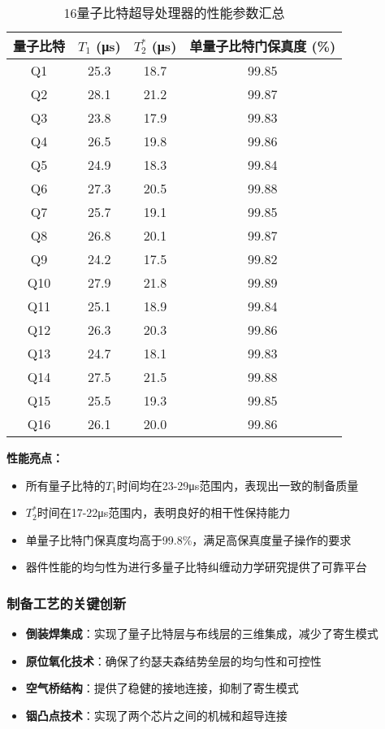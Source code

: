 \documentclass[11pt,a4paper]{article}
\begin{document}
\begin{table}[H]
\centering
\caption{16量子比特超导处理器的性能参数汇总}
\begin{tabular}{cccc}
\toprule
\textbf{量子比特} & \textbf{$T_1$ (μs)} & \textbf{$T_2^*$ (μs)} & \textbf{单量子比特门保真度 (\%)} \\
\midrule
Q1 & 25.3 & 18.7 & 99.85 \\
Q2 & 28.1 & 21.2 & 99.87 \\
Q3 & 23.8 & 17.9 & 99.83 \\
Q4 & 26.5 & 19.8 & 99.86 \\
Q5 & 24.9 & 18.3 & 99.84 \\
Q6 & 27.3 & 20.5 & 99.88 \\
Q7 & 25.7 & 19.1 & 99.85 \\
Q8 & 26.8 & 20.1 & 99.87 \\
Q9 & 24.2 & 17.5 & 99.82 \\
Q10 & 27.9 & 21.8 & 99.89 \\
Q11 & 25.1 & 18.9 & 99.84 \\
Q12 & 26.3 & 20.3 & 99.86 \\
Q13 & 24.7 & 18.1 & 99.83 \\
Q14 & 27.5 & 21.5 & 99.88 \\
Q15 & 25.5 & 19.3 & 99.85 \\
Q16 & 26.1 & 20.0 & 99.86 \\
\bottomrule
\end{tabular}
\label{tab:device_performance}
\end{table}

\textbf{性能亮点：}
\begin{itemize}
    \item 所有量子比特的$T_1$时间均在23-29μs范围内，表现出一致的制备质量
    \item $T_2^*$时间在17-22μs范围内，表明良好的相干性保持能力
    \item 单量子比特门保真度均高于99.8\%，满足高保真度量子操作的要求
    \item 器件性能的均匀性为进行多量子比特纠缠动力学研究提供了可靠平台
\end{itemize}

\subsubsection{制备工艺的关键创新}

\begin{itemize}
    \item \textbf{倒装焊集成}：实现了量子比特层与布线层的三维集成，减少了寄生模式
    \item \textbf{原位氧化技术}：确保了约瑟夫森结势垒层的均匀性和可控性
    \item \textbf{空气桥结构}：提供了稳健的接地连接，抑制了寄生模式
    \item \textbf{铟凸点技术}：实现了两个芯片之间的机械和超导连接
\end{itemize}
\end{document}

